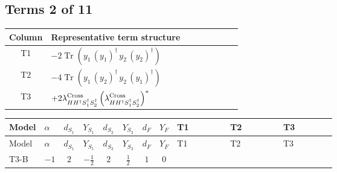 \documentclass[8pt]{article}
\begin{document}
\begin{landscape}
\subsection*{Terms 2 of 11}
\begin{center}
\begin{tabular}{@{}c >{\raggedright\arraybackslash}p{0.82\linewidth}@{}}
\toprule
Column & Representative term structure \\
\midrule
T1 & \(\displaystyle -2 \operatorname{Tr}\!\left({y_1}\,\left({y_1}\right)^{\dagger}\,{y_2}\,\left({y_2}\right)^{\dagger}\right)\) \\
\midrule
T2 & \(\displaystyle -4 \operatorname{Tr}\!\left({y_1}\,\left({y_2}\right)^{\dagger}\,{y_2}\,\left({y_1}\right)^{\dagger}\right)\) \\
\midrule
T3 & \(\displaystyle +2 {\lambda_{H H^\dagger S_1^\dagger S_2^\dagger}^{\rm Cross}} \left({\lambda_{H H^\dagger S_1^\dagger S_2^\dagger}^{\rm Cross}}\right)^{*}\) \\
\midrule
\bottomrule
\end{tabular}
\end{center}
\smallskip
\tiny
\begin{longtable}{@{}llcccccc >{\raggedright\arraybackslash}p{0.21\linewidth} >{\raggedright\arraybackslash}p{0.21\linewidth} >{\raggedright\arraybackslash}p{0.21\linewidth}@{}}
\toprule
Model & $\alpha$ & $d_{S_1}$ & $Y_{S_1}$ & $d_{S_2}$ & $Y_{S_2}$ & $d_F$ & $Y_F$ & T1 & T2 & T3 \\
\midrule
\endfirsthead
\toprule
Model & $\alpha$ & $d_{S_1}$ & $Y_{S_1}$ & $d_{S_2}$ & $Y_{S_2}$ & $d_F$ & $Y_F$ & T1 & T2 & T3 \\
\midrule
\endhead
T3-B & $-1$ & $2$ & $-\frac{1}{2}$ & $2$ & $\frac{1}{2}$ & $1$ & $0$ & \scriptsize\adjustbox{max width=\linewidth}{$\begin{gathered} -2 \operatorname{Tr}\!\left({y_1}\,\left({y_1}\right)^{\dagger}\,{y_2}\,\left({y_2}\right)^{\dagger}\right)\end{gathered}$} & \scriptsize\adjustbox{max width=\linewidth}{$\begin{gathered} -4 \operatorname{Tr}\!\left({y_1}\,\left({y_2}\right)^{\dagger}\,{y_2}\,\left({y_1}\right)^{\dagger}\right)\end{gathered}$} & \scriptsize\adjustbox{max width=\linewidth}{$\begin{gathered} +2 {\lambda_{H H^\dagger S_1^\dagger S_2^\dagger}^{\rm Cross}} \left({\lambda_{H H^\dagger S_1^\dagger S_2^\dagger}^{\rm Cross}}\right)^{*}\end{gathered}$} \\

\end{longtable}
\end{landscape}
\end{document}
